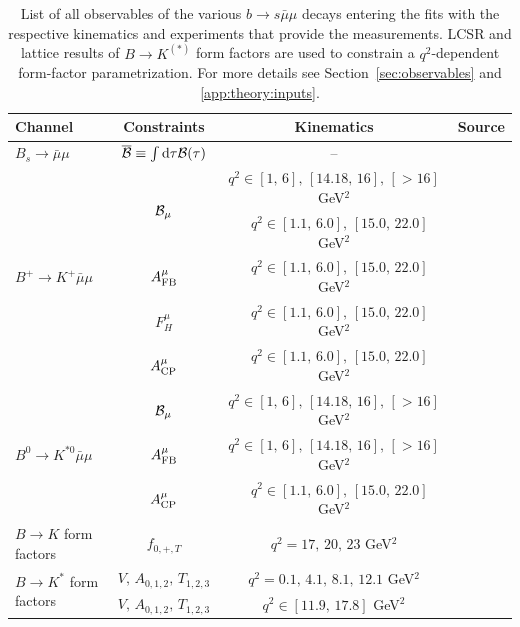 \documentclass[twocolumn,epjc3]{svjour3}
\numberwithin{equation}{section}
\def \refsec#1{Section~\ref{#1}}
\def \refapp#1{\ref{#1}}
\newcommand{\checked}[1]{{\color{brown}{ {\bf Checked: }{#1}}}}
\renewcommand{\checked}[1]{#1}
\renewcommand{\[}{\big[}
\renewcommand{\]}{\big]}
\renewcommand{\(}{\big(}
\renewcommand{\)}{\big)}
\newcommand{\dd}{{\rm d}}
\def \BR{{\cal B}}                               %
\begin{document}
\begin{table}
\begin{center}
\renewcommand{\arraystretch}{1.4}
\begin{tabular}{lccc}
\hline
Channel & Constraints & Kinematics & Source
\\
\hline \hline
$B_s\to \bar\mu\mu$
& $\overline{\cal B} \equiv \int\dd\tau \BR(\tau)$ &  --  & \cite{Aaij:2013aka,Chatrchyan:2013bka,CMS:2014xfa}
\\
\hline
\multirow{5}{*}{${B^+\to K^+ \bar\mu\mu}$}
    & \multirow{2}{*}{$\BR_\mu$}
    & $q^2\in [1,\, 6],\, [14.18,\, 16],\, [> 16]$ GeV$^2$  & \cite{CDF:2012:BKstarll} \\
    &
    &  $\,\,\,\,\, q^2 \in [1.1,\, 6.0],\, [15.0,\, 22.0]$ GeV$^2$  & \cite{Aaij:2014pli} \\
    & $A_{\rm FB}^\mu$
    &  $\,\,\,\,\, q^2 \in [1.1,\, 6.0],\, [15.0,\, 22.0]$ GeV$^2$  & \cite{Aaij:2014tfa, CDF:2012:BKstarll} \\
    & $F_{H}^\mu$
    &  $\,\,\,\,\, q^2 \in [1.1,\, 6.0],\, [15.0,\, 22.0]$ GeV$^2$  & \cite{Aaij:2014tfa} \\
    & $A_{\rm CP}^\mu$
    &  $\,\,\,\,\, q^2 \in [1.1,\, 6.0],\, [15.0,\, 22.0]$ GeV$^2$  & \cite{Aaij:2014bsa}
\\
\hline
    \multirow{3}{*}{${B^0\to K^{\ast 0} \bar\mu\mu}$}
    & $\BR_\mu$
    & $q^2\in [1,\, 6],\, [14.18,\, 16],\, [> 16]$ GeV$^2$  & \cite{CDF:2012:BKstarll, Aaij:2013iag,Chatrchyan:2013cda} \\
    & $A_{\rm FB}^\mu$
    & $q^2\in [1,\, 6],\, [14.18,\, 16],\, [> 16]$ GeV$^2$  & \cite{CDF:2012:BKstarll, Aaij:2013iag,Chatrchyan:2013cda} \\
    & $A_{\rm CP}^\mu$
    &  $\,\,\,\,\, q^2 \in [1.1,\, 6.0],\, [15.0,\, 22.0]$ GeV$^2$  & \cite{Aaij:2014bsa}
\\
\hline
${B\to K}$ form factors
    & $f_{0,+,T}$   &  $q^2 = 17,\, 20,\, 23$ GeV$^2$  & \cite{Bouchard:2013eph} \\
\hline
\multirow{2}{*}{${B\to K^*}$ {form factors}}
    & $V,\,A_{0,1,2},\, T_{1,2,3}$ &  $q^2 = 0.1,\, 4.1,\, 8.1,\, 12.1$ GeV$^2$  & \cite{Straub:2015ica} \\
    & $V,\,A_{0,1,2},\, T_{1,2,3}$
    & $q^2 \in [11.9,\, 17.8]$ GeV$^2$  & \cite{Horgan:2013hoa, Horgan:2015vla}  \\
\hline
\end{tabular}
\renewcommand{\arraystretch}{1.0}
\caption{\label{tab:observables} List of all observables of the various $b\to s
  \bar\mu\mu$ decays entering the fits with the respective kinematics and
  experiments that provide the measurements. LCSR and lattice results of $B\to
  K^{(*)}$ form factors are used to constrain a $q^2$-dependent form-factor
  parametrization.  For more details see \refsec{sec:observables} and
  \refapp{app:theory:inputs}. \checked{} }
\end{center}
\end{table}
\end{document}
